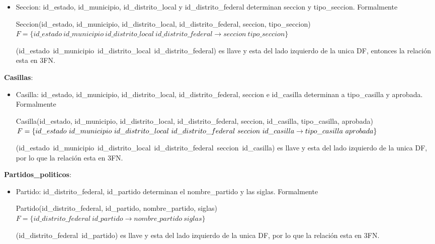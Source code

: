 \documentclass[a4paper,twoside,11pt]{article}
\begin{document}
\begin{itemize}
  \item Seccion: id\_estado, id\_municipio, id\_distrito\_local y id\_distrito\_federal
        determinan seccion y tipo\_seccion. Formalmente

        Seccion(id\_estado, id\_municipio, id\_distrito\_local, id\_distrito\_federal, seccion,
        tipo\_seccion)\\
        $F=\{id\_estado~id\_municipio~id\_distrito\_local~id\_distrito\_federal\rightarrow
             seccion~tipo\_seccion\}$

        (id\_estado~id\_municipio~id\_distrito\_local~id\_distrito\_federal) es llave y esta del lado
        izquierdo de la unica DF, entonces la relación esta en 3FN.
\end{itemize}

\textbf{Casillas}:
\begin{itemize}
  \item Casilla: id\_estado, id\_municipio, id\_distrito\_local, id\_distrito\_federal, seccion
        e id\_casilla determinan a tipo\_casilla y aprobada. Formalmente

        Casilla(id\_estado, id\_municipio, id\_distrito\_local, id\_distrito\_federal,
         seccion, id\_casilla, tipo\_casilla, aprobada)\\
        $F=\{id\_estado~id\_municipio~id\_distrito\_local~id\_distrito\_federal~seccion~id\_casilla\rightarrow\\
        tipo\_casilla~aprobada\}$

        (id\_estado~id\_municipio~id\_distrito\_local~id\_distrito\_federal~seccion~id\_casilla) es
        llave y esta del lado izquierdo de la unica DF, por lo que la relación esta en 3FN.
\end{itemize}

\textbf{Partidos\_politicos}:
\begin{itemize}
  \item Partido: id\_distrito\_federal, id\_partido determinan el nombre\_partido y las siglas.
        Formalmente

        Partido(id\_distrito\_federal, id\_partido, nombre\_partido, siglas)\\
        $F=\{id\_distrito\_federal~id\_partido\rightarrow nombre\_partido~siglas\}$

        (id\_distrito\_federal~id\_partido) es llave y esta del lado izquierdo de la unica DF,
        por lo que la relación esta en 3FN.
\end{itemize}
\end{document}
